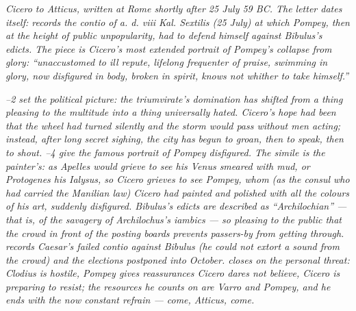 
\textit{Cicero to Atticus, written at Rome shortly after 25
July 59 BC. The letter dates itself:  records
the contio of \textit{a. d. viii Kal. Sextilis} (25 July) at
which Pompey, then at the height of public unpopularity, had
to defend himself against Bibulus's edicts. The piece is
Cicero's most extended portrait of Pompey's collapse from
glory: ``unaccustomed to ill repute, lifelong frequenter of
praise, swimming in glory, now disfigured in body, broken in
spirit, knows not whither to take himself.''}

\textit{--2 set the political picture: the
triumvirate's domination has shifted from a thing pleasing to
the multitude into a thing universally hated. Cicero's hope
had been that the wheel had turned silently and the storm
would pass without men acting; instead, after long secret
sighing, the city has begun to groan, then to speak, then to
shout. --4 give the famous portrait of Pompey
disfigured. The simile is the painter's: as Apelles would
grieve to see his Venus smeared with mud, or Protogenes his
Ialysus, so Cicero grieves to see Pompey, whom (as the
consul who had carried the Manilian law) Cicero had painted
and polished with all the colours of his art, suddenly
disfigured. Bibulus's edicts are described as ``Archilochian'' ---
that is, of the savagery of Archilochus's iambics --- so
pleasing to the public that the crowd in front of the posting
boards prevents passers-by from getting through. 
records Caesar's failed contio against Bibulus (he could not
extort a sound from the crowd) and the elections postponed
into October.  closes on the personal threat:
Clodius is hostile, Pompey gives reassurances Cicero dares
not believe, Cicero is preparing to resist; the resources
he counts on are Varro and Pompey, and he ends with the now
constant refrain --- come, Atticus, come.}
